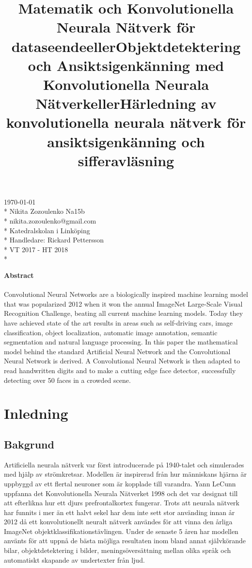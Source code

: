 \documentclass[a4paper,11pt,twoside]{article}
\title{Matematik och Konvolutionella Neurala Nätverk för dataseende}
\title{eller}
\title{Objektdetektering och Ansiktsigenkänning med Konvolutionella Neurala Nätverk}
\title{eller}
\title{Härledning av konvolutionella neurala nätverk för ansiktsigenkänning och sifferavläsning}
\date{}
\begin{document}
\maketitle
\vfill

\begin{flushright}
\today \\*
Nikita Zozoulenko Na15b \\*
nikita.zozoulenko@gmail.com \\*
Katedralskolan i Linköping\\*
Handledare: Rickard Pettersson \\*
VT 2017 - HT 2018 \\*
\end{flushright}
\newpage

\Large{\textbf{Abstract}}\\\\
Convolutional Neural Networks are a biologically inspired machine learning model that was popularized 2012 when it won the annual ImageNet Large-Scale Visual Recognition Challenge, beating all current machine learning models. Today they have achieved state of the art results in areas such as self-driving cars, image classification, object localization, automatic image annotation, semantic segmentation and natural language processing. In this paper the mathematical model behind the standard Artificial Neural Network and the Convolutional Neural Network is derived. A Convolutional Neural Network is then adapted to read handwritten digits and to make a cutting edge face detector, successfully detecting over 50 faces in a crowded scene.
\newpage

\tableofcontents

\section{Inledning}

\subsection{Bakgrund}
Artificiella neurala nätverk var först introducerade på 1940-talet och simulerades med hjälp av strömkretsar. Modellen är inspirerad från hur människans hjärna är uppbyggd av ett flertal neuroner som är kopplade till varandra. Yann LeCunn uppfanna det Konvolutionella Neurala Nätverket 1998 och det var designat till att efterlikna hur ett djurs prefrontalkortex fungerar. Trots att neurala nätverk har funnits i mer än ett halvt sekel har dem inte sett stor använding innan år 2012 då ett konvolutionellt neuralt nätverk användes för att vinna den årliga ImageNet objektklassifikationstävlingen. Under de senaste 5 åren har modellen använts för att uppnå de bästa möjliga resultaten inom bland annat självkörande bilar, objektdetektering i bilder, meningsöversättning mellan olika språk och automatiskt skapande av undertexter från ljud. \cite{cs231n}
\end{document}
